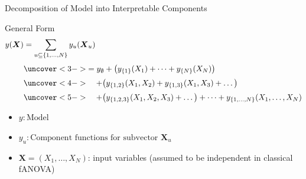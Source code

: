   

\begin{frame}{Decomposition of Model into Interpretable Components} %
\begin{block}{General Form}
\[
  \begin{aligned}
    y(\boldsymbol{X}) 
    &= \sum_{u \subseteq \{1,\dots,N\}} y_{u}(\boldsymbol{X}_u) \\[3pt]
    &\uncover<3->{= y_{\emptyset} 
       + \big( y_{\{1\}}(X_1) + \dots + y_{\{N\}}(X_N) \big)} \\[2pt]
    &\uncover<4->{\quad + \big( y_{\{1, 2\}}(X_1,X_2) 
                 + y_{\{1, 3\}}(X_1,X_3) + \dots \big)} \\[2pt]
    &\uncover<5->{\quad + \big( y_{\{1, 2, 3\}}(X_1,X_2,X_3) + \dots \big) 
       + \dots + y_{\{1, \dots, N\}}(X_1, \dots, X_N)}
  \end{aligned}
\]
\end{block}

\begin{itemize}
  \item<2-> $y : \text{Model}$
  \item<2-> $y_u : \text{Component functions for subvector } \boldsymbol{X}_u$
  \item<2-> $\boldsymbol{X} = (X_1, \dots, X_N)$: input variables (assumed to be independent in classical fANOVA)
\end{itemize}
\end{frame}

